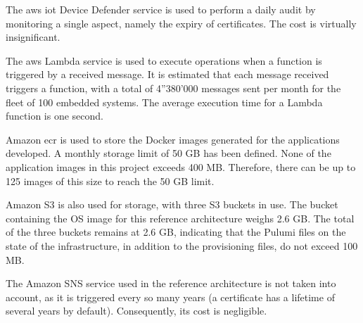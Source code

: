 The \gls{aws} \acrshort{iot} Device Defender service is used to perform a daily audit by monitoring a single aspect, namely the expiry of certificates. The cost is virtually insignificant.

The \gls{aws} Lambda service is used to execute operations when a function is triggered by a received message. It is estimated that each message received triggers a function, with a total of 4''380'000 messages sent per month for the fleet of 100 embedded systems. The average execution time for a Lambda function is one second.

Amazon \acrfull{ecr} is used to store the Docker images generated for the applications developed. A monthly storage limit of 50 GB has been defined. None of the application images in this project exceeds 400 MB. Therefore, there can be up to 125 images of this size to reach the 50 GB limit.

Amazon S3 is also used for storage, with three S3 buckets in use. The bucket containing the OS image for this reference architecture weighs 2.6 GB. The total of the three buckets remains at 2.6 GB, indicating that the Pulumi files on the state of the infrastructure, in addition to the provisioning files, do not exceed 100 MB.

The Amazon SNS service used in the reference architecture is not taken into account, as it is triggered every so many years (a certificate has a lifetime of several years by default). Consequently, its cost is negligible.